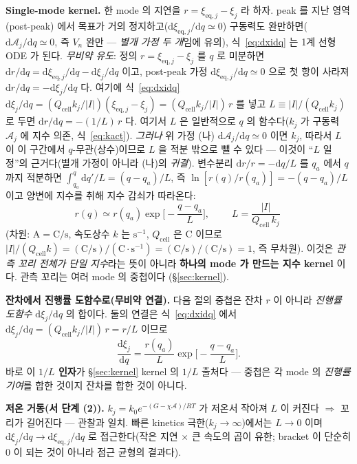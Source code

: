 \documentclass[11pt,a4paper]{article}
\newcommand{\dd}{\mathrm{d}}
\newcommand{\eq}{\mathrm{eq}}
\newcommand{\cell}{\mathrm{cell}}
\begin{document}
\textbf{Single-mode kernel.} 한 mode 의 지연을 $r=\xi_{\eq,j}-\xi_j$ 라 하자. peak 를 지난 영역(post-peak)
에서 목표가 거의 정지하고($\dd\xi_{\eq,j}/\dd q\simeq0$) 구동력도 완만하면($\dd\mathcal A_j/\dd q\simeq0$,
즉 $V_n$ 완만 — \emph{별개 가정 두 개}임에 유의), 식~\eqref{eq:dxidq} 는 1계 선형 ODE 가 된다.
\emph{무비약 유도}: 정의 $r=\xi_{\eq,j}-\xi_j$ 를 $q$ 로 미분하면 $\dd r/\dd q=\dd\xi_{\eq,j}/\dd q-\dd\xi_j/\dd q$
이고, post-peak 가정 $\dd\xi_{\eq,j}/\dd q\simeq0$ 으로 첫 항이 사라져 $\dd r/\dd q=-\dd\xi_j/\dd q$ 다. 여기에
식~\eqref{eq:dxidq} $\dd\xi_j/\dd q=(Q_\cell k_j/|I|)(\xi_{\eq,j}-\xi_j)=(Q_\cell k_j/|I|)\,r$ 를 넣고
$L\equiv|I|/(Q_\cell k_j)$ 로 두면 $\dd r/\dd q=-(1/L)\,r$ 다. 여기서 $L$ 은 일반적으로 $q$ 의 함수다($k_j$ 가
구동력 $\mathcal A_j$ 에 지수 의존, 식~\eqref{eq:kact}). \emph{그러나} 위 가정 (나) $\dd\mathcal A_j/\dd q\simeq0$
이면 $k_j$, 따라서 $L$ 이 이 구간에서 $q$-무관(상수)이므로 $L$ 을 적분 밖으로 뺄 수 있다 — 이것이 ``$L$ 일정''의
근거다(별개 가정이 아니라 (나)의 \emph{귀결}). 변수분리 $\dd r/r=-\dd q/L$ 를 $q_a$ 에서 $q$ 까지 적분하면
$\int_{q_a}^q \dd q'/L=(q-q_a)/L$, 즉 $\ln[r(q)/r(q_a)]=-(q-q_a)/L$ 이고 양변에 지수를 취해 지수 감쇠가 따라온다:
\begin{equation}
r(q)\simeq r(q_a)\exp\!\Big[-\frac{q-q_a}{L}\Big],\qquad \boxed{\;L=\frac{|I|}{Q_\cell\,k_j}\;}
\label{eq:single_kernel}
\end{equation}
(차원: $\mathrm A=\mathrm{C/s}$, 속도상수 $k$ 는 $\mathrm{s^{-1}}$, $Q_\cell$ 은 $\mathrm C$ 이므로
$|I|/(Q_\cell k)=(\mathrm{C/s})/(\mathrm C\cdot\mathrm{s^{-1}})=(\mathrm{C/s})/(\mathrm{C/s})=1$, 즉 무차원).
이것은 \emph{관측 꼬리 전체가 단일
지수}라는 뜻이 아니라 \textbf{하나의 mode 가 만드는 지수 kernel} 이다. 관측 꼬리는 여러 mode 의 중첩이다
(\S\ref{sec:kernel}).

\textbf{잔차에서 진행률 도함수로(무비약 연결).} 다음 절의 중첩은 잔차 $r$ 이 아니라 \emph{진행률 도함수}
$\dd\xi_j/\dd q$ 의 합이다. 둘의 연결은 식~\eqref{eq:dxidq} 에서 $\dd\xi_j/\dd q=(Q_\cell k_j/|I|)\,r=r/L$
이므로
\begin{equation}
\frac{\dd\xi_j}{\dd q}=\frac{r(q_a)}{L}\exp\!\Big[-\frac{q-q_a}{L}\Big].
\label{eq:single_dxidq}
\end{equation}
바로 이 \textbf{$1/L$ 인자}가 \S\ref{sec:kernel} kernel 의 $1/L$ 출처다 — 중첩은 각 mode 의 \emph{진행률
기여}를 합한 것이지 잔차를 합한 것이 아니다.

\textbf{저온 거동(서 단계 (2)).} $k_j=k_0e^{-(G-\chi\mathcal A)/RT}$ 가 저온서 작아져 $L$ 이 커진다 $\Rightarrow$
꼬리가 길어진다 — 관찰과 일치. 빠른 kinetics 극한($k_j\to\infty$)에서는 $L\to0$ 이며 $\dd\xi_j/\dd q\to
\dd\xi_{\eq,j}/\dd q$ 로 접근한다(작은 지연 $\times$ 큰 속도의 곱이 유한; bracket 이 단순히 0 이 되는 것이
아니라 점근 균형의 결과다).
\end{document}
